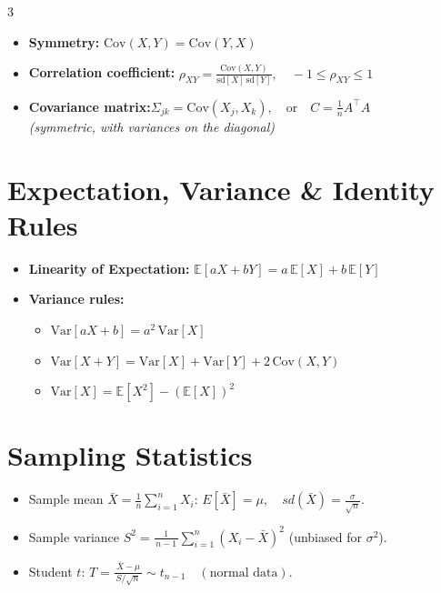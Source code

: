 \documentclass[10pt,landscape]{article}
\begin{document}
\begin{multicols}{3}
\begin{itemize}
  \item \textbf{Symmetry:} 
    $\displaystyle \mathrm{Cov}(X,Y) = \mathrm{Cov}(Y,X)$

  \item \textbf{Correlation coefficient:}
    $\displaystyle \rho_{XY} = \frac{\mathrm{Cov}(X,Y)}{\mathrm{sd}[X]\,\mathrm{sd}[Y]}, \quad -1 \leq \rho_{XY} \leq 1$

  \item \textbf{Covariance matrix:}$ \Sigma_{jk} = \mathrm{Cov}(X_j, X_k), \quad \text{or} \quad C = \frac{1}{n} A^\top A$ \\
 \textit{(symmetric, with variances on the diagonal)}
\end{itemize}

\section{Expectation, Variance \& Identity Rules}
\begin{itemize}
  \item \textbf{Linearity of Expectation:} 
    $\displaystyle \mathbb{E}[aX + bY] = a\,\mathbb{E}[X] + b\,\mathbb{E}[Y]$

  \item \textbf{Variance rules:}
    \begin{itemize}
      \item $\displaystyle \mathrm{Var}[aX + b] = a^2\,\mathrm{Var}[X]$
      \item $\displaystyle \mathrm{Var}[X + Y] = \mathrm{Var}[X] + \mathrm{Var}[Y] + 2\,\mathrm{Cov}(X,Y)$
      \item $\displaystyle \mathrm{Var}[X] = \mathbb{E}[X^2] - \left(\mathbb{E}[X]\right)^2$
    \end{itemize}
\end{itemize}


\section{Sampling Statistics}
\begin{itemize}
  \item Sample mean $\displaystyle \bar X = \tfrac{1}{n}\sum_{i=1}^n X_i$: $E[\bar X]=\mu,\quad sd(\bar X)=\tfrac{\sigma}{\sqrt{n}}.$
  \item Sample variance $\displaystyle S^2 = \tfrac{1}{\,n-1\,}\sum_{i=1}^n (X_i - \bar X)^2$ (unbiased for $\sigma^2$).
  \item Student $t$: $\displaystyle T = \frac{\bar X - \mu}{\,S/\sqrt{n}\,} \sim t_{n-1}\quad(\text{normal data}).$
\end{itemize}


\end{multicols}
\end{document}
